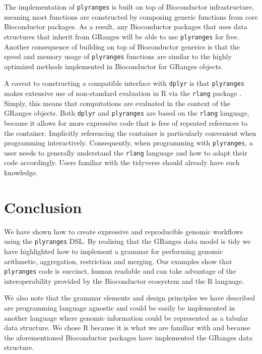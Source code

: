\documentclass[]{article}
\begin{document}
The implementation of \texttt{plyranges} is built on top of Bioconductor
infrastructure, meaning most functions are constructed by composing
generic functions from core Bioconductor packages. As a result, any
Bioconductor packages that uses data structures that inherit from
GRanges will be able to use \texttt{plyranges} for free. Another
consequence of building on top of Bioconductor generics is that the
speed and memory usage of \texttt{plyranges} functions are similar to
the highly optimized methods implemented in Bioconductor for GRanges
objects.

A caveat to constructing a compatible interface with \texttt{dplyr} is
that \texttt{plyranges} makes extensive use of non-standard evaluation
in R via the \texttt{rlang} package \cite{R-rlang}. Simply, this means
that computations are evaluated in the context of the GRanges objects.
Both \texttt{dplyr} and \texttt{plyranges} are based on the
\texttt{rlang} language, because it allows for more expressive code that
is free of repeated references to the container. Implicitly referencing
the container is particularly convenient when programming interactively.
Consequently, when programming with \texttt{plyranges}, a user needs to
generally understand the \texttt{rlang} language and how to adapt their
code accordingly. Users familiar with the tidyverse should already have
such knowledge.

\hypertarget{conclusion}{%
\section{Conclusion}\label{conclusion}}

We have shown how to create expressive and reproducible genomic
workflows using the \texttt{plyranges} DSL. By realising that the
GRanges data model is tidy we have highlighted how to implement a
grammar for performing genomic arithmetic, aggregation, restriction and
merging. Our examples show that \texttt{plyranges} code is succinct,
human readable and can take advantage of the interoperability provided
by the Bioconductor ecosystem and the R language.

We also note that the grammar elements and design principles we have
described are programming language agnostic and could be easily be
implemented in another language where genomic information could be
represented as a tabular data structure. We chose R because it is what
we are familiar with and because the aforementioned Bioconductor
packages have implemented the GRanges data structure.
\end{document}

